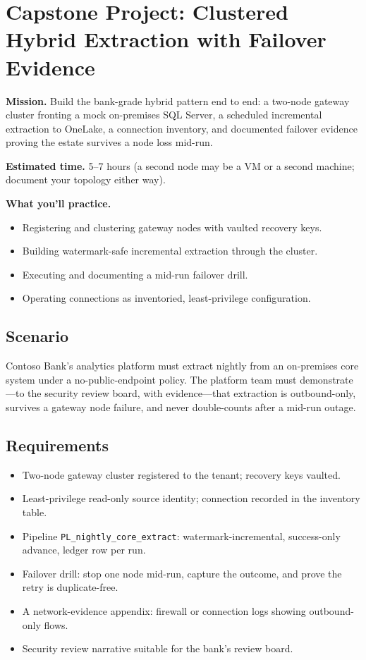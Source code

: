 \section{Capstone Project: Clustered Hybrid Extraction with Failover Evidence}\label{sec:ch11-capstone}

\begin{capstonebox}
\textbf{Mission.} Build the bank-grade hybrid pattern end to end: a two-node gateway cluster fronting a mock on-premises SQL Server, a scheduled incremental extraction to OneLake, a connection inventory, and documented failover evidence proving the estate survives a node loss mid-run.

\textbf{Estimated time.} 5--7 hours (a second node may be a VM or a second machine; document your topology either way).

\textbf{What you'll practice.}
\begin{itemize}
    \item Registering and clustering gateway nodes with vaulted recovery keys.
    \item Building watermark-safe incremental extraction through the cluster.
    \item Executing and documenting a mid-run failover drill.
    \item Operating connections as inventoried, least-privilege configuration.
\end{itemize}
\end{capstonebox}

\subsection*{Scenario}
Contoso Bank's analytics platform must extract nightly from an on-premises core system under a no-public-endpoint policy. The platform team must demonstrate---to the security review board, with evidence---that extraction is outbound-only, survives a gateway node failure, and never double-counts after a mid-run outage.

\subsection*{Requirements}
\begin{itemize}
    \item Two-node gateway cluster registered to the tenant; recovery keys vaulted.
    \item Least-privilege read-only source identity; connection recorded in the inventory table.
    \item Pipeline \texttt{PL\_nightly\_core\_extract}: watermark-incremental, success-only advance, ledger row per run.
    \item Failover drill: stop one node mid-run, capture the outcome, and prove the retry is duplicate-free.
    \item A network-evidence appendix: firewall or connection logs showing outbound-only flows.
    \item Security review narrative suitable for the bank's review board.
\end{itemize}

